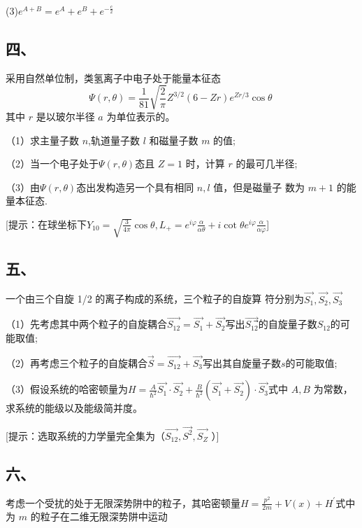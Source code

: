 (3)$e^{A+B} =e^A+e^B+e^{-\frac{c}{2}}$ 
\subsection{四、}

采用自然单位制，类氢离子中电子处于能量本征态
$$\Psi(r,\theta)=\frac{1}{81}\sqrt{\frac{2}{\pi}}Z^{3/2}(6-Zr)e^{Zr/3}\cos\theta~$$
其中 $r$ 是以玻尔半径 $a$ 为单位表示的。

（1）求主量子数 $n$,轨道量子数 $l$ 和磁量子数 $m$ 的值;

（2）当一个电子处于$\Psi(r,\theta)$态且 $Z=1$ 时，计算 $r$ 的最可几半径;

（3）由$\Psi(r,\theta)$态出发构造另一个具有相同 $n,l$ 值，但是磁量子
数为 $m+1$ 的能量本征态.

[提示：在球坐标下$Y_{10}=\sqrt{\frac{3}{4 \pi}}\cos\theta,L_+=e^{i\varphi}\frac{\alpha}{\alpha\theta}+i\cot\theta e^{i\varphi}\frac{\alpha}{\alpha\varphi}$]
\subsection{五、}
一个由三个自旋 1/2 的离子构成的系统，三个粒子的自旋算
符分别为$\vec{S_1},\vec{S_2},\vec{S_3}$

（1）先考虑其中两个粒子的自旋耦合$\vec{S_{12}}=\vec{S_1}+\vec{S_2}$写出$\vec{S_{12}}$⃗的自旋量子数$S_{12}$的可能取值;

（2）再考虑三个粒子的自旋耦合$\vec{S}=\vec{S_12}+\vec{S_3}$写出其自旋量子数$s$的可能取值;

（3）假设系统的哈密顿量为$H=\frac{A}{\hbar^2}\vec{S_1}\cdot\vec{S_2}+\frac{B}{\hbar^2}(\vec{S_1}+\vec{S_2})\cdot\vec{S_3}$式中 $A,B$ 为常数，求系统的能级以及能级简并度。

[提示：选取系统的力学量完全集为（$\vec{S_{12}} , \vec{S^2}  , \vec{S_Z}$ ）]
\subsection{六、}
考虑一个受扰的处于无限深势阱中的粒子，其哈密顿量$H=\frac{p^2}{2m}+V(x)+H^\prime$式中为 $m$ 的粒子在二维无限深势阱中运动
